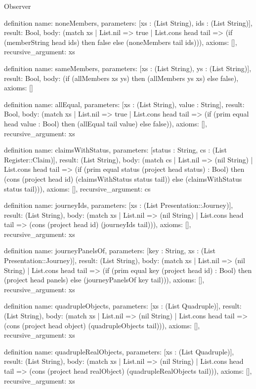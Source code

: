 \begin{lexlean}{Observer}
\begin{semanticmodule}
definition{
  name: noneMembers,
  parameters: [xs : (List String), ids : (List String)],
  result: Bool,
  body: (match xs
    | List.nil => true
    | List.cons head tail => (if (memberString head ids) then false else (noneMembers tail ids))),
  axioms: [],
  recursive_argument: xs
}

definition{
  name: sameMembers,
  parameters: [xs : (List String), ys : (List String)],
  result: Bool,
  body: (if (allMembers xs ys) then (allMembers ys xs) else false),
  axioms: []
}

definition{
  name: allEqual,
  parameters: [xs : (List String), value : String],
  result: Bool,
  body: (match xs
    | List.nil => true
    | List.cons head tail => (if (prim equal head value : Bool) then (allEqual tail value) else false)),
  axioms: [],
  recursive_argument: xs
}

definition{
  name: claimsWithStatus,
  parameters: [status : String, cs : (List Register::Claim)],
  result: (List String),
  body: (match cs
    | List.nil => (nil String)
    | List.cons head tail => (if (prim equal status (project head status) : Bool) then (cons (project head id) (claimsWithStatus status tail)) else (claimsWithStatus status tail))),
  axioms: [],
  recursive_argument: cs
}

definition{
  name: journeyIds,
  parameters: [xs : (List Presentation::Journey)],
  result: (List String),
  body: (match xs
    | List.nil => (nil String)
    | List.cons head tail => (cons (project head id) (journeyIds tail))),
  axioms: [],
  recursive_argument: xs
}

definition{
  name: journeyPanelsOf,
  parameters: [key : String, xs : (List Presentation::Journey)],
  result: (List String),
  body: (match xs
    | List.nil => (nil String)
    | List.cons head tail => (if (prim equal key (project head id) : Bool) then (project head panels) else (journeyPanelsOf key tail))),
  axioms: [],
  recursive_argument: xs
}

definition{
  name: quadrupleObjects,
  parameters: [xs : (List Quadruple)],
  result: (List String),
  body: (match xs
    | List.nil => (nil String)
    | List.cons head tail => (cons (project head object) (quadrupleObjects tail))),
  axioms: [],
  recursive_argument: xs
}

definition{
  name: quadrupleRealObjects,
  parameters: [xs : (List Quadruple)],
  result: (List String),
  body: (match xs
    | List.nil => (nil String)
    | List.cons head tail => (cons (project head realObject) (quadrupleRealObjects tail))),
  axioms: [],
  recursive_argument: xs
}


\end{semanticmodule}
\end{lexlean}
